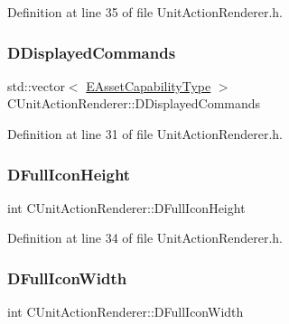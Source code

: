 Definition at line 35 of file Unit\+Action\+Renderer.\+h.

\hypertarget{classCUnitActionRenderer_a194c87c9f3280485f4abceb8d39853b3}{}\label{classCUnitActionRenderer_a194c87c9f3280485f4abceb8d39853b3} 
\subsubsection{\texorpdfstring{D\+Displayed\+Commands}{DDisplayedCommands}}
{\footnotesize\ttfamily std\+::vector$<$ \hyperlink{GameDataTypes_8h_a35b98ce26aca678b03c6f9f76e4778ce}{E\+Asset\+Capability\+Type} $>$ C\+Unit\+Action\+Renderer\+::\+D\+Displayed\+Commands\hspace{0.3cm}{\ttfamily [protected]}}



Definition at line 31 of file Unit\+Action\+Renderer.\+h.

\hypertarget{classCUnitActionRenderer_a11b30763b92ed0cbfb842f86fe76fe26}{}\label{classCUnitActionRenderer_a11b30763b92ed0cbfb842f86fe76fe26} 
\subsubsection{\texorpdfstring{D\+Full\+Icon\+Height}{DFullIconHeight}}
{\footnotesize\ttfamily int C\+Unit\+Action\+Renderer\+::\+D\+Full\+Icon\+Height\hspace{0.3cm}{\ttfamily [protected]}}



Definition at line 34 of file Unit\+Action\+Renderer.\+h.

\hypertarget{classCUnitActionRenderer_a67e5c1650ef8f849c05d9f059d12fb95}{}\label{classCUnitActionRenderer_a67e5c1650ef8f849c05d9f059d12fb95} 
\subsubsection{\texorpdfstring{D\+Full\+Icon\+Width}{DFullIconWidth}}
{\footnotesize\ttfamily int C\+Unit\+Action\+Renderer\+::\+D\+Full\+Icon\+Width\hspace{0.3cm}{\ttfamily [protected]}}



